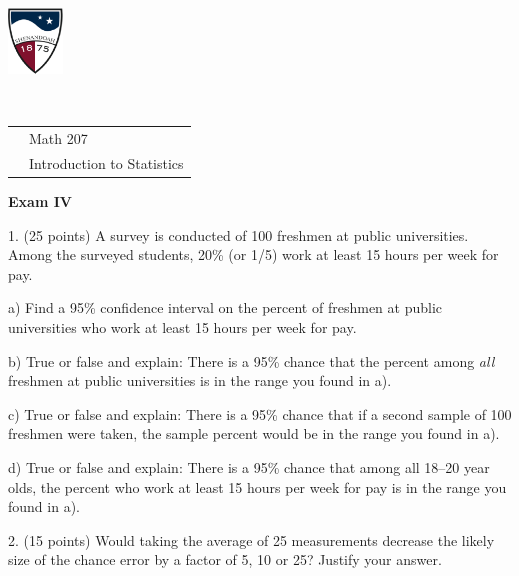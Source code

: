 \documentclass[10pt]{article}
\begin{document}
\href{http://www.su.edu}{\includegraphics[height=1.75cm]{sulogo.eps}}
\vspace{-1.69cm}

{{\ }\hfill\small
\begin{tabular}{cl}
& Math 207\\
& Introduction to Statistics\\
\end{tabular}
}
\begin{center}
\textbf{\large  Exam IV}
\end{center}
\medskip

1. (25 points) A survey is conducted of 100 freshmen at public universities.
Among the surveyed  students, 20\% (or 1/5) work at least 15 hours per week for pay.

\hspace{20pt} a) Find a 95\% confidence interval
on the  percent of freshmen at public universities who work at least 15 hours per week for pay.
\vspace{2.3in}

\hspace{20pt} b) True or false and explain:  There is a 95\% chance that the
percent among \textit{all} freshmen at public universities is in the range you found in a).
\vspace{1.5in}

\hspace{20pt} c) True or false and explain:  There is a 95\% chance that
if a second sample of 100 freshmen were taken,
the sample percent would be in the range you found in a).
\vspace{1.5in}


\hspace{20pt} d) True or false and explain:  There is a 95\% chance that 
 among all 18--20 year olds, the percent who work at least 15 hours per week for pay 
is in the range you found in a).
\vspace{1in}
\vfill
\eject
{\ }



2. (15 points)
Would taking the average of 25 measurements decrease
the likely size of the chance error by a factor of 5, 10 or 25? Justify your answer.
\vspace{1.5in}
\end{document}
